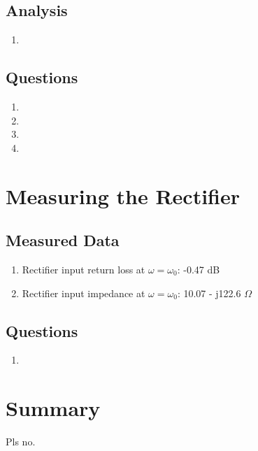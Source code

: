 \documentclass{article}
\begin{document}
\subsection{Analysis}

\begin{enumerate}
	\item 
\end{enumerate}

\subsection{Questions}

\begin{enumerate}
	\item
	\item
	\item
	\item
\end{enumerate}


\section{Measuring the Rectifier}

\subsection{Measured Data}

\begin{enumerate}
	\item Rectifier input return loss at $\omega = \omega_0$: -0.47 dB
	\item Rectifier input impedance at $\omega = \omega_0$: 10.07 - j122.6 $\Omega$
\end{enumerate}

\subsection{Questions}

\begin{enumerate}
	\item
\end{enumerate}

\section{Summary}
Pls no.
\end{document}
